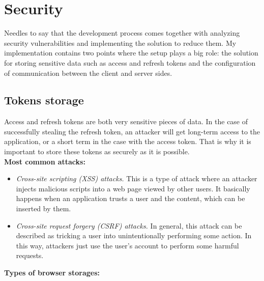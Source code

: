 \section{Security} Needles to say that the development process comes together with analyzing security vulnerabilities and implementing the solution to reduce them. My implementation contains two points where the setup plays a big role: the solution for storing sensitive data such as access and refresh tokens and the configuration of communication between the client and server sides.


\subsection{Tokens storage} Access and refresh tokens are both very sensitive pieces of data. In the case of successfully stealing the refresh token, an attacker will get long-term access to the application, or a short term in the case with the access token. That is why it is important to store these tokens as securely as it is possible.\\

\noindent \textbf{Most common attacks:} 

\begin{itemize}
    \item \emph{Cross-site scripting (XSS) attacks.} This is a type of attack where an attacker injects malicious scripts into a web page viewed by other users. It basically happens when an application trusts a user and the content, which can be inserted by them. 
    \item \emph{Cross-site request forgery (CSRF) attacks.} In general, this attack can be described as tricking a user into unintentionally performing some action. In this way, attackers just use the user's account to perform some harmful requests.
\end{itemize}


\noindent \textbf{Types of browser storages:} 

